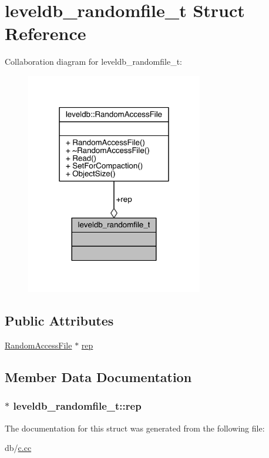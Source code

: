 \hypertarget{structleveldb__randomfile__t}{}\section{leveldb\+\_\+randomfile\+\_\+t Struct Reference}
\label{structleveldb__randomfile__t}


Collaboration diagram for leveldb\+\_\+randomfile\+\_\+t\+:\nopagebreak
\begin{figure}[H]
\begin{center}
\leavevmode
\includegraphics[width=219pt]{structleveldb__randomfile__t__coll__graph}
\end{center}
\end{figure}
\subsection*{Public Attributes}
\begin{DoxyCompactItemize}
\item 
\hyperlink{classleveldb_1_1_random_access_file}{Random\+Access\+File} $\ast$ \hyperlink{structleveldb__randomfile__t_a66667ecc756a0ca312bbc94e2dfc27a5}{rep}
\end{DoxyCompactItemize}


\subsection{Member Data Documentation}
\hypertarget{structleveldb__randomfile__t_a66667ecc756a0ca312bbc94e2dfc27a5}{}
\subsubsection[{rep}]{$\ast$ leveldb\+\_\+randomfile\+\_\+t\+::rep}\label{structleveldb__randomfile__t_a66667ecc756a0ca312bbc94e2dfc27a5}


The documentation for this struct was generated from the following file\+:\begin{DoxyCompactItemize}
\item 
db/\hyperlink{c_8cc}{c.\+cc}\end{DoxyCompactItemize}
